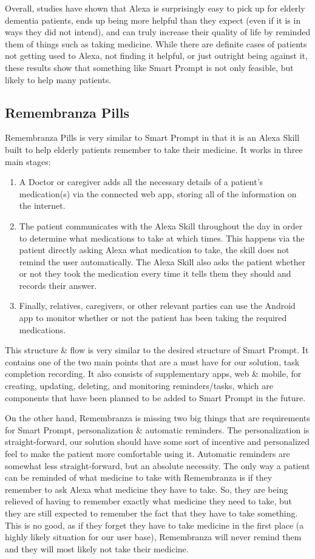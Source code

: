\documentclass[11pt, oneside]{article}
\begin{document}
Overall, studies have shown that Alexa is surprisingly easy to pick up for elderly dementia patients, ends up being more helpful than they expect (even if it is in ways they did not intend), and can truly increase their quality of life by reminded them of things such as taking medicine. 
While there are definite cases of patients not getting used to Alexa, not finding it helpful, or just outright being against it, these results show that something like Smart Prompt is not only feasible, but likely to help many patients. 

\subsection{Remembranza Pills}

Remembranza Pills \cite{b3} is very similar to Smart Prompt in that it is an Alexa Skill built to help elderly patients remember to take their medicine. 
It works in three main stages: 
\begin{enumerate}
  \item A Doctor or caregiver adds all the necessary details of a patient's medication(s) via the connected web app, storing all of the information on the internet.
  \item The patient communicates with the Alexa Skill throughout the day in order to determine what medications to take at which times. This happens via the patient directly asking Alexa what medication to take, the skill does not remind the user automatically. The Alexa Skill also asks the patient whether or not they took the medication every time it tells them they should and records their answer.
  \item Finally, relatives, caregivers, or other relevant parties can use the Android app to monitor whether or not the patient has been taking the required medications. 
\end{enumerate}

This structure \& flow is very similar to the desired structure of Smart Prompt. 
It contains one of the two main points that are a must have for our solution, task completion recording. 
It also consists of supplementary apps, web \& mobile, for creating, updating, deleting, and monitoring reminders/tasks, which are components that have been planned to be added to Smart Prompt in the future. 

On the other hand, Remembranza is missing two big things that are requirements for Smart Prompt, personalization \& automatic reminders. 
The personalization is straight-forward, our solution should have some sort of incentive and personalized feel to make the patient more comfortable using it. 
Automatic reminders are somewhat less straight-forward, but an absolute necessity. 
The only way a patient can be reminded of what medicine to take with Remembranza is if they remember to ask Alexa what medicine they have to take. 
So, they are being relieved of having to remember exactly what medicine they need to take, but they are still expected to remember the fact that they have to take something. 
This is no good, as if they forget they have to take medicine in the first place (a highly likely situation for our user base), Remembranza will never remind them and they will most likely not take their medicine. 
\end{document}
